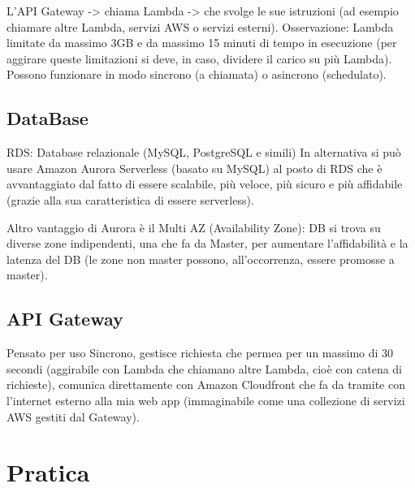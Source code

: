 \documentclass{classes/base}
\begin{document}
    L'API Gateway -> chiama Lambda -> che svolge le sue istruzioni (ad esempio chiamare altre Lambda, servizi AWS o servizi esterni).
    Osservazione: Lambda limitate da massimo 3GB e da massimo 15 minuti di tempo in esecuzione (per aggirare queste limitazioni si deve, in caso, dividere il carico su più Lambda).
    Possono funzionare in modo sincrono (a chiamata) o asincrono (schedulato).

    \subsection*{DataBase}
    RDS: Database relazionale (MySQL, PostgreSQL e simili)
    In alternativa si può usare Amazon Aurora Serverless (basato su MySQL) al posto di RDS che è avvantaggiato dal fatto di essere scalabile, più veloce, più sicuro e più affidabile (grazie alla sua caratteristica di essere serverless).

    Altro vantaggio di Aurora è il Multi AZ (Availability Zone): DB si trova su diverse zone indipendenti, una che fa da Master, per aumentare l'affidabilità e la latenza del DB (le zone non master possono, all'occorrenza, essere promosse a master).

    \subsection*{API Gateway} 
    Pensato per uso Sincrono, gestisce richiesta che permea per un massimo di 30 secondi (aggirabile con Lambda che chiamano altre Lambda, cioè con catena di richieste),
    comunica direttamente con Amazon Cloudfront che fa da tramite con l'internet esterno alla mia web app (immaginabile come una collezione di servizi AWS gestiti dal Gateway).

    \section*{Pratica}
\end{document}
